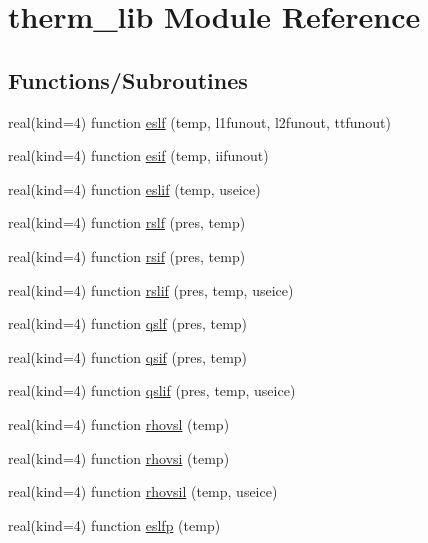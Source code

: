 \hypertarget{namespacetherm__lib}{}\section{therm\+\_\+lib Module Reference}
\label{namespacetherm__lib}
\subsection*{Functions/\+Subroutines}
\begin{DoxyCompactItemize}
\item 
real(kind=4) function \hyperlink{namespacetherm__lib_a82ae02323247d6435153002a309552fb}{eslf} (temp, l1funout, l2funout, ttfunout)
\item 
real(kind=4) function \hyperlink{namespacetherm__lib_a109004866b1542dfcfa1da1e5130d3c9}{esif} (temp, iifunout)
\item 
real(kind=4) function \hyperlink{namespacetherm__lib_a5cebdf07920a9af5a0cbc49bafbc30b4}{eslif} (temp, useice)
\item 
real(kind=4) function \hyperlink{namespacetherm__lib_abd775a071488452f724ab50c60cebe4b}{rslf} (pres, temp)
\item 
real(kind=4) function \hyperlink{namespacetherm__lib_a16031b6116a46111467e9923e566dd49}{rsif} (pres, temp)
\item 
real(kind=4) function \hyperlink{namespacetherm__lib_acc637bbfa1fdd9b523e2b1cf3dce2926}{rslif} (pres, temp, useice)
\item 
real(kind=4) function \hyperlink{namespacetherm__lib_a383a9c98cdc308ddc74f774336a68c70}{qslf} (pres, temp)
\item 
real(kind=4) function \hyperlink{namespacetherm__lib_a4c010ed765cc5d45d55e2fb76cb3ec89}{qsif} (pres, temp)
\item 
real(kind=4) function \hyperlink{namespacetherm__lib_a44ab3a68e6060bf4afbfc504e3a8c633}{qslif} (pres, temp, useice)
\item 
real(kind=4) function \hyperlink{namespacetherm__lib_ade00ab1323488985b9569ba9a5dcde44}{rhovsl} (temp)
\item 
real(kind=4) function \hyperlink{namespacetherm__lib_a1fbd9c44eee7d212c59b884df5f03718}{rhovsi} (temp)
\item 
real(kind=4) function \hyperlink{namespacetherm__lib_a981917e8b19e34bc9f094d6aa4416c26}{rhovsil} (temp, useice)
\item 
real(kind=4) function \hyperlink{namespacetherm__lib_a4339cfce3e15e3410bcc7ba6a7d6ba06}{eslfp} (temp)

\end{DoxyCompactItemize}
